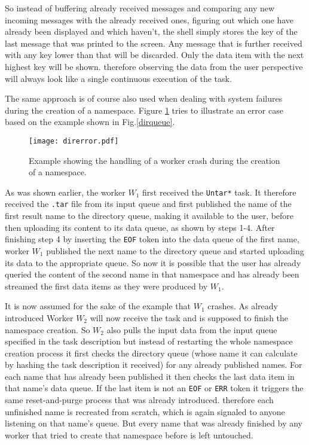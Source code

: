 So instead of buffering already received messages and comparing
any new incoming messages with the already received ones, figuring
out which one have already been displayed and which haven't, the
shell simply stores the key of the last message that was printed
to the screen. Any message that is further received with any key
lower than that will be discarded. Only the data item with the
next highest key will be shown. therefore observing the data
from the user perspective will always look like a single
continuous execution of the task.
\newline

The same approach is of course also used when dealing with system failures
during the creation of a namespace. Figure \ref{direrror} tries
to illustrate an error case based on the example shown in
Fig.\ref{dirqueue}.

\begin{figure}[h]
  \texttt{[image: direrror.pdf]}
  \caption{Example showing the handling of a worker crash during
           the creation of a namespace.}
  \label{direrror}
\end{figure}

As was shown earlier, the worker $W_{1}$ first received the
\texttt{Untar*} task. It therefore received the \texttt{.tar} file
from its input queue and first published the name of the first
result name to the directory queue, making it available to
the user, before then uploading its content to its data queue,
as shown by steps 1-4. After finishing step 4 by inserting
the \texttt{EOF} token into the data queue of the first name, worker
$W_{1}$ published the next name to the directory queue and
started uploading its data to the appropriate queue. So now
it is possible that the user has already queried the content
of the second name in that namespace and has already been streamed
the first data items as they were produced by $W_{1}$.

It is now assumed for the sake of the example that $W_{1}$ crashes.
As already introduced Worker $W_{2}$ will
now receive the task and is supposed to finish the
namespace creation. So $W_{2}$ also pulls the input data
from the input queue specified in the task description but
instead of restarting the whole namespace creation process it
first checks the directory queue (whose name it can calculate
by hashing the task description it received) for any already
published names. For each name that has already been published
it then checks the last data item in that name's data queue.
If the last item is not an \texttt{EOF} or \texttt{ERR} token
it triggers the same reset-and-purge process that was already
introduced. therefore each unfinished name is recreated from scratch,
which is again signaled to anyone listening on that name's queue.
But every name that was already finished by any worker that tried
to create that namespace before is left untouched.

